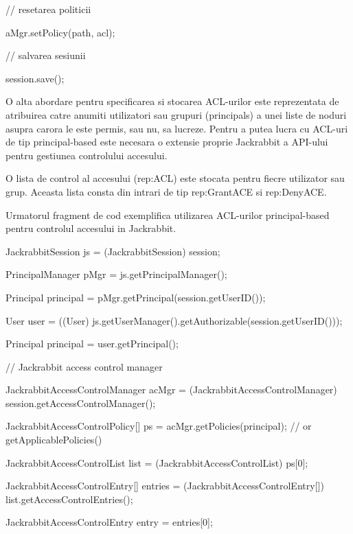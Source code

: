 \bigskip

// resetarea politicii

aMgr.setPolicy(path, acl);


\bigskip

// salvarea sesiunii

session.save();


\bigskip

O alta abordare pentru specificarea si stocarea ACL-urilor este reprezentata de atribuirea catre anumiti utilizatori sau grupuri (principals) a unei liste de noduri asupra carora le este permis, sau nu, sa lucreze. Pentru a putea lucra cu ACL-uri de tip principal-based este necesara o extensie proprie Jackrabbit a API-ului pentru gestiunea controlului accesului.

O lista de control al accesului (rep:ACL) este stocata pentru fiecre utilizator sau grup. Aceasta lista consta din intrari de tip rep:GrantACE si rep:DenyACE.

Urmatorul fragment de cod exemplifica utilizarea ACL-urilor principal-based pentru controlul accesului in Jackrabbit.


\bigskip

JackrabbitSession js = (JackrabbitSession) session;


\bigskip

PrincipalManager pMgr = js.getPrincipalManager();

Principal principal = pMgr.getPrincipal(session.getUserID());


\bigskip

User user = ((User) js.getUserManager().getAuthorizable(session.getUserID()));

Principal principal = user.getPrincipal();


\bigskip

// Jackrabbit access control manager

JackrabbitAccessControlManager acMgr = (JackrabbitAccessControlManager) session.getAccessControlManager();


\bigskip

JackrabbitAccessControlPolicy[] ps = acMgr.getPolicies(principal); // or getApplicablePolicies()

JackrabbitAccessControlList list = (JackrabbitAccessControlList) ps[0];


\bigskip

JackrabbitAccessControlEntry[] entries = (JackrabbitAccessControlEntry[]) list.getAccessControlEntries();

JackrabbitAccessControlEntry entry = entries[0];


